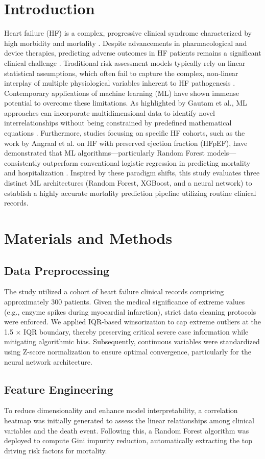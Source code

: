 \documentclass[
  journal=medium,
  manuscript=article-type,
  year=2026,
  volume=37,
]{cup-journal}
\begin{document}
\section{Introduction}
Heart failure (HF) is a complex, progressive clinical syndrome characterized by high morbidity and mortality
. Despite advancements in pharmacological and device therapies, predicting adverse outcomes in HF patients remains a significant clinical challenge
. Traditional risk assessment models typically rely on linear statistical assumptions, which often fail to capture the complex, non-linear interplay of multiple physiological variables inherent to HF pathogenesis
.
Contemporary applications of machine learning (ML) have shown immense potential to overcome these limitations. As highlighted by Gautam et al., ML approaches can incorporate multidimensional data to identify novel interrelationships without being constrained by predefined mathematical equations
. Furthermore, studies focusing on specific HF cohorts, such as the work by Angraal et al. on HF with preserved ejection fraction (HFpEF), have demonstrated that ML algorithms—particularly Random Forest models—consistently outperform conventional logistic regression in predicting mortality and hospitalization
. Inspired by these paradigm shifts, this study evaluates three distinct ML architectures (Random Forest, XGBoost, and a neural network) to establish a highly accurate mortality prediction pipeline utilizing routine clinical records.

\section{Materials and Methods}
\subsection{Data Preprocessing}
The study utilized a cohort of heart failure clinical records comprising approximately 300 patients. Given the medical significance of extreme values (e.g., enzyme spikes during myocardial infarction), strict data cleaning protocols were enforced. We applied IQR-based winsorization to cap extreme outliers at the 1.5 × IQR boundary, thereby preserving critical severe case information while mitigating algorithmic bias. Subsequently, continuous variables were standardized using Z-score normalization to ensure optimal convergence, particularly for the neural network architecture.
\subsection{Feature Engineering}
To reduce dimensionality and enhance model interpretability, a correlation heatmap was initially generated to assess the linear relationships among clinical variables and the death event. Following this, a Random Forest algorithm was deployed to compute Gini impurity reduction, automatically extracting the top driving risk factors for mortality.
\end{document}
